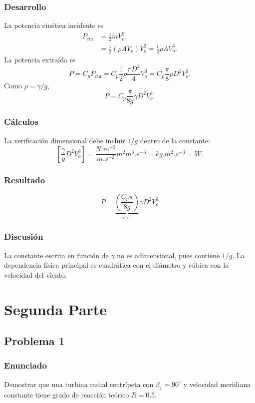 \documentclass[12pt]{article}
\newcommand{\resultado}[1]{\[
  \boxed{\displaystyle #1}
\]}
\begin{document}
\subsubsection*{Desarrollo}
La potencia cinética incidente es
\begin{align*}
P_{\mathrm{cin}}&=\frac{1}{2}\dot mV_o^2,\\
&=\frac{1}{2}(\rho AV_o)V_o^2
=\frac{1}{2}\rho AV_o^3.
\end{align*}
La potencia extraída es
\[
P=C_pP_{\mathrm{cin}}
=C_p\frac{1}{2}\rho\frac{\pi D^2}{4}V_o^3
=C_p\frac{\pi}{8}\rho D^2V_o^3.
\]
Como $\rho=\gamma/g$,
\[
P=C_p\frac{\pi}{8g}\gamma D^2V_o^3.
\]

\subsubsection*{Cálculos}
La verificación dimensional debe incluir $1/g$ dentro de la constante:
\[
\left[\frac{\gamma}{g}D^2V_o^3\right]
=\frac{\si{N.m^{-3}}}{\si{m.s^{-2}}}\si{m^2}
\si{m^3.s^{-3}}
=\si{kg.m^2.s^{-3}}=\si{W}.
\]

\subsubsection*{Resultado}
\resultado{P=\underbrace{\left(\frac{C_p\pi}{8g}\right)}_{\mathrm{cte.}}
\gamma D^2V_o^3}

\subsubsection*{Discusión}
La constante escrita en función de $\gamma$ no es adimensional, pues contiene $1/g$. La
dependencia física principal es cuadrática con el diámetro y cúbica con la velocidad del
viento.

\section{Segunda Parte}

\subsection{Problema 1}

\subsubsection*{Enunciado}
Demostrar que una turbina radial centrípeta con $\beta_1=90^\circ$ y velocidad meridiana
constante tiene grado de reacción teórico $R=0.5$.
\end{document}

